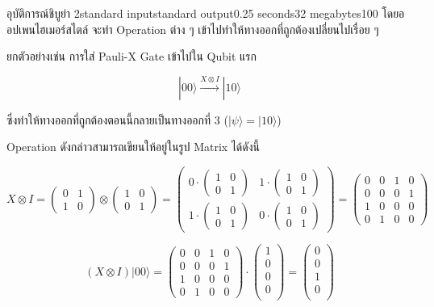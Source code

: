 \documentclass[11pt,a4paper]{article}
\begin{document}
\begin{problem}{อุบัติการณ์ชิบูย่า 2}{standard input}{standard output}{0.25 seconds}{32 megabytes}{100}
โดยออปเพนไฮเมอร์สไตล์ จะทำ Operation ต่าง ๆ เข้าไปทำให้ทางออกที่ถูกต้องเปลี่ยนไปเรื่อย ๆ

ยกตัวอย่างเช่น การใส่ Pauli-X Gate เข้าไปใน Qubit แรก

$$|00\rangle \xrightarrow{X \otimes I} |10\rangle$$

ซึ่งทำให้ทางออกที่ถูกต้องตอนนี้กลายเป็นทางออกที่ 3 ($|\psi\rangle = |10\rangle$)

Operation ดังกล่าวสามารถเขียนให้อยู่ในรูป Matrix ได้ดังนี้

$$X \otimes I = \begin{pmatrix}
0 & 1 \\
1 & 0
\end{pmatrix} \otimes \begin{pmatrix}
1 & 0\\
0 & 1
\end{pmatrix} = \begin{pmatrix}
0\cdot\begin{pmatrix}
1 & 0\\
0 & 1
\end{pmatrix} & 1\cdot\begin{pmatrix}
1 & 0\\
0 & 1
\end{pmatrix}\\
1\cdot\begin{pmatrix}
1 & 0\\
0 & 1
\end{pmatrix} & 0\cdot\begin{pmatrix}
1 & 0\\
0 & 1
\end{pmatrix}
\end{pmatrix} = \begin{pmatrix}
0 & 0 & 1 & 0 \\
0 & 0 & 0 & 1 \\
1 & 0 & 0 & 0 \\
0 & 1 & 0 & 0
\end{pmatrix}$$

$$(X \otimes I)|00\rangle = \begin{pmatrix}
0 & 0 & 1 & 0 \\
0 & 0 & 0 & 1 \\
1 & 0 & 0 & 0 \\
0 & 1 & 0 & 0
\end{pmatrix} \cdot \begin{pmatrix}
1 \\
0 \\
0 \\
0 \\
\end{pmatrix} = \begin{pmatrix}
0 \\
0 \\
1 \\
0 \\
\end{pmatrix}$$


\end{problem}
\end{document}
